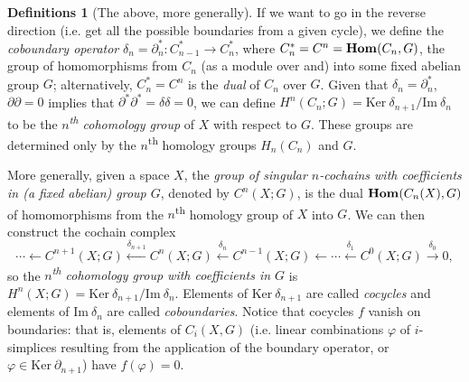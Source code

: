 \documentclass[11pt]{article}
\theoremstyle{definition}
\newtheorem*{definitions*}{Definitions}
\newcommand{\Hom}[2][]{\mathbf{Hom}_{#1}\hspace{-2pt}\left(#2\right)}	%
\newcommand{\Kernel}[1]{\mathrm{Ker}\ #1}		%
\newcommand{\Image}[1]{\mathrm{Im}\ #1}			%
\begin{document}
\begin{definitions*}[The above, more generally]
			If we want to go in the reverse direction (i.e. get all the possible boundaries from a given cycle), we define the \textit{coboundary operator} $\delta_n = \partial_n^*: C^*_{n-1} \to C^*_n$, where $C^*_n = C^n = \Hom{C_n, G}$, the group of homomorphisms from $C_n$ (as a module over and) into some fixed abelian group $G$; alternatively, $C^*_n = C^n$ is the \textit{dual} of $C_n$ over $G$. Given that $\delta_n = \partial_n^*$, $\partial \partial = 0$ implies that $\partial^*\partial^* = \delta\delta = 0$, we can define $H^n(C_n; G) = \Kernel{\delta_{n+1}} / \Image{\delta_n}$ to be the \textit{$n$\textsuperscript{th} cohomology group} of $X$ with respect to $G$. These groups are determined only by the $n$\textsuperscript{th} homology groups $H_n(C_n)$ and $G$.
			
			More generally, given a space $X$, the \textit{group of singular $n$-cochains with coefficients in (a fixed abelian) group $G$}, denoted by $C^n(X; G)$, is the dual $\Hom{C_n(X), G}$ of homomorphisms from the $n$\textsuperscript{th} homology group of $X$ into $G$. We can then construct the cochain complex $$ \cdots \longleftarrow C^{n+1}(X;G) \overset{\delta_{n+1}}{\longleftarrow} C^n(X;G) \overset{\delta_n}{\longleftarrow} C^{n-1}(X;G) \longleftarrow \cdots \overset{\delta_1}{\longleftarrow} C^0(X;G) \overset{\delta_0}{\longrightarrow} 0, $$ so the \textit{$n$\textsuperscript{th} cohomology group with coefficients in $G$} is $H^n(X;G) = \Kernel{\delta_{n+1}} / \Image{\delta_n}$. Elements of $\Kernel{\delta_{n+1}}$ are called \textit{cocycles} and elements of $\Image{\delta_n}$ are called \textit{coboundaries}. Notice that cocycles $f$ vanish on boundaries: that is, elements of $C_i(X, G)$ (i.e. linear combinations $\varphi$ of $i$-simplices resulting from the application of the boundary operator, or $\varphi \in \Kernel \partial_{n+1}$) have $f(\varphi) = 0$. 
		\end{definitions*}
		
\end{document}
